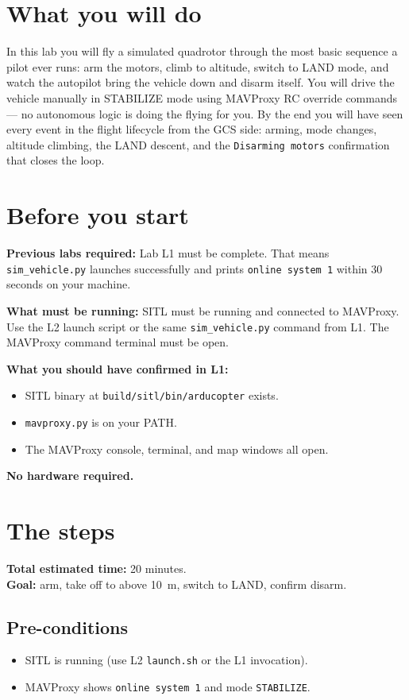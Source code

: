 \documentclass[a4paper,11pt,twoside]{article}
\begin{document}
\section*{What you will do}

In this lab you will fly a simulated quadrotor through the most basic sequence a pilot ever runs: arm the motors, climb to altitude, switch to LAND mode, and watch the autopilot bring the vehicle down and disarm itself. You will drive the vehicle manually in STABILIZE mode using MAVProxy RC override commands --- no autonomous logic is doing the flying for you. By the end you will have seen every event in the flight lifecycle from the GCS side: arming, mode changes, altitude climbing, the LAND descent, and the \texttt{Disarming motors} confirmation that closes the loop.

\section*{Before you start}

\textbf{Previous labs required:} Lab L1 must be complete. That means \texttt{sim\_vehicle.py} launches successfully and prints \texttt{online system 1} within 30 seconds on your machine.

\textbf{What must be running:} SITL must be running and connected to MAVProxy. Use the L2 launch script or the same \texttt{sim\_vehicle.py} command from L1. The MAVProxy command terminal must be open.

\textbf{What you should have confirmed in L1:}
\begin{itemize}
  \item SITL binary at \texttt{build/sitl/bin/arducopter} exists.
  \item \texttt{mavproxy.py} is on your PATH.
  \item The MAVProxy console, terminal, and map windows all open.
\end{itemize}

\textbf{No hardware required.}

\section*{The steps}

\textbf{Total estimated time:} 20 minutes.\\
\textbf{Goal:} arm, take off to above 10~m, switch to LAND, confirm disarm.

\subsection*{Pre-conditions}
\begin{itemize}
  \item SITL is running (use L2 \texttt{launch.sh} or the L1 invocation).
  \item MAVProxy shows \texttt{online system 1} and mode \texttt{STABILIZE}.
\end{itemize}
\end{document}
